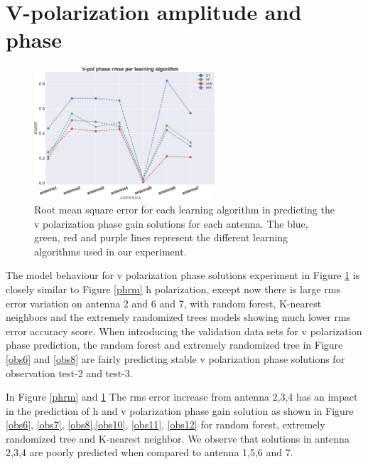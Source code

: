 \section{V-polarization amplitude and phase}
\label{Vp}
\begin{figure}[H]
  \centering
    \includegraphics[width=0.6\textwidth]{images/Vpol-phase.eps}
    \caption{Root mean square error for each learning algorithm in predicting the v polarization phase gain solutions for each antenna. The blue, green, red and purple lines represent the different learning algorithms used in our experiment.}
  \label{phrmv}
 \end{figure}
The model behaviour for v polarization phase solutions experiment in Figure \ref{phrmv} is closely similar to Figure \ref{phrm} h polarization, except now there is large rms error variation on antenna 2 and 6 and 7, with random forest, K-nearest neighbors and the extremely randomized trees models showing much lower rms error accuracy score. When introducing the validation data sets for v polarization phase prediction, the random forest and extremely randomized tree in Figure \ref{obs6} and \ref{obs8} are fairly predicting stable v polarization phase solutions for observation test-2 and test-3.

In Figure \ref{phrm} and \ref{phrmv} The rms error increase from antenna 2,3,4 has an impact in the prediction of h and v polarization phase gain solution as shown in Figure \ref{obs6}, \ref{obs7}, \ref{obs8},\ref{obs10}, \ref{obs11}, \ref{obs12} for random forest, extremely randomized tree and K-nearest neighbor. We observe that solutions in antenna 2,3,4 are poorly predicted when compared to antenna 1,5,6 and 7. 

